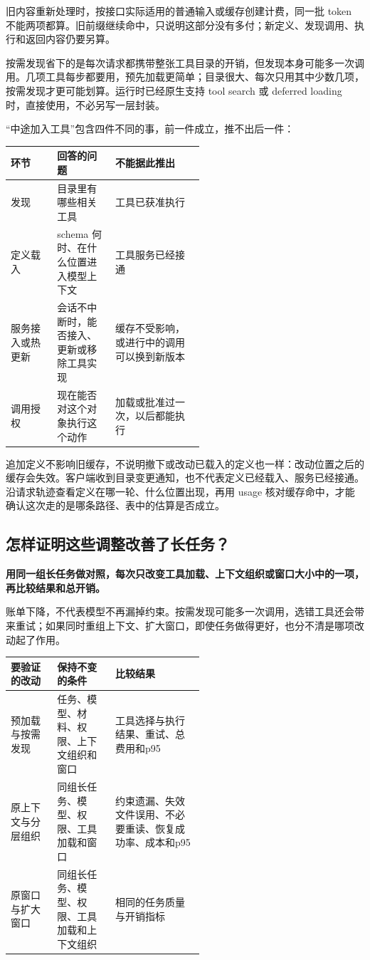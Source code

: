 \documentclass[a4paper,11pt]{ctexart}
\begin{document}
旧内容重新处理时，按接口实际适用的普通输入或缓存创建计费，同一批 token 不能两项都算。旧前缀继续命中，只说明这部分没有多付；新定义、发现调用、执行和返回内容仍要另算。

按需发现省下的是每次请求都携带整张工具目录的开销，但发现本身可能多一次调用。几项工具每步都要用，预先加载更简单；目录很大、每次只用其中少数几项，按需发现才更可能划算。运行时已经原生支持 tool search 或 deferred loading 时，直接使用，不必另写一层封装。

“中途加入工具”包含四件不同的事，前一件成立，推不出后一件：

\begingroup\small\setlength{\tabcolsep}{5pt}\renewcommand{\arraystretch}{1.25}\keepXColumns
\begin{tabularx}{\linewidth}{L{0.24\linewidth} L{0.30\linewidth} X}
\toprule
\textbf{环节} & \textbf{回答的问题} & \textbf{不能据此推出} \\
\midrule
发现 & 目录里有哪些相关工具 & 工具已获准执行 \\
定义载入 & schema 何时、在什么位置进入模型上下文 & 工具服务已经接通 \\
服务接入或热更新 & 会话不中断时，能否接入、更新或移除工具实现 & 缓存不受影响，或进行中的调用可以换到新版本 \\
调用授权 & 现在能否对这个对象执行这个动作 & 加载或批准过一次，以后都能执行 \\
\bottomrule
\end{tabularx}
\endgroup

追加定义不影响旧缓存，不说明撤下或改动已载入的定义也一样：改动位置之后的缓存会失效。客户端收到目录变更通知，也不代表定义已经载入、服务已经接通。沿请求轨迹查看定义在哪一轮、什么位置出现，再用 usage 核对缓存命中，才能确认这次走的是哪条路径、表中的估算是否成立。

\subsection{怎样证明这些调整改善了长任务？}
\noindent\textbf{用同一组长任务做对照，每次只改变工具加载、上下文组织或窗口大小中的一项，再比较结果和总开销。}\par\medskip

账单下降，不代表模型不再漏掉约束。按需发现可能多一次调用，选错工具还会带来重试；如果同时重组上下文、扩大窗口，即使任务做得更好，也分不清是哪项改动起了作用。

\begingroup\small\setlength{\tabcolsep}{5pt}\renewcommand{\arraystretch}{1.25}\keepXColumns
\begin{tabularx}{\linewidth}{L{0.24\linewidth} L{0.30\linewidth} X}
\toprule
\textbf{要验证的改动} & \textbf{保持不变的条件} & \textbf{比较结果} \\
\midrule
预加载与按需发现 & 任务、模型、材料、权限、上下文组织和窗口 & 工具选择与执行结果、重试、总费用和p95 \\
原上下文与分层组织 & 同组长任务、模型、权限、工具加载和窗口 & 约束遗漏、失效文件误用、不必要重读、恢复成功率、成本和p95 \\
原窗口与扩大窗口 & 同组长任务、模型、权限、工具加载和上下文组织 & 相同的任务质量与开销指标 \\
\bottomrule
\end{tabularx}
\endgroup
\end{document}
